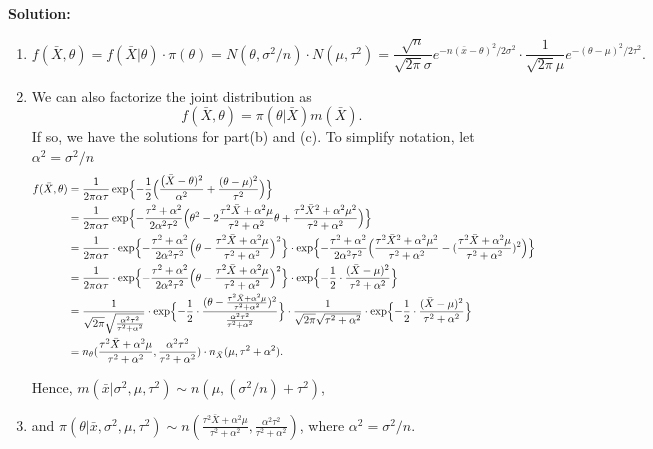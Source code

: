 \documentclass[11pt]{article}
\newcommand{\Sol}{\par {\bf Solution:}}
\begin{document}
\Sol
\begin{enumerate}[label=(\alph*)]
    \item
    \[
    f(\bar X, \theta) = f(\bar X | \theta) \cdot \pi(\theta) = N(\theta, \sigma^2/n) \cdot N(\mu, \tau^2) = \frac{\sqrt{n}}{\sqrt{2\pi}\sigma}e^{-n(\bar x - \theta)^2/2\sigma^2} \cdot \frac{1}{\sqrt{2\pi}\mu}e^{-(\theta - \mu)^2/2\tau^2}.
    \]
    
    \item
    We can also factorize the joint distribution as
    \[
    f(\bar X, \theta) = \pi(\theta|\bar X) m(\bar X).
    \]
    If so, we have the solutions for part(b) and (c).
    To simplify notation, let $\alpha^2 = \sigma^2/n$
    \begin{align*}
        f(\bar X, \theta) &= \frac{1}{2\pi \alpha \tau}\exp \Bigl\{-\frac{1}{2} \Bigl( \frac{\bigl(\bar X - \theta)^2}{\alpha^2} + \frac{(\theta - \mu)^2}{\tau^2} \Bigr) \Bigr\} \\
        &= \frac{1}{2\pi \alpha \tau} \exp \Bigl\{-\frac{\tau^2 + \alpha^2}{2\alpha^2\tau^2} \Bigl( \theta^2 - 2\frac{\tau^2\bar X + \alpha^2\mu}{\tau^2 + \alpha^2}\theta + \frac{\tau^2\bar X^2 + \alpha^2\mu^2}{\tau^2 + \alpha^2} \Bigr) \Bigr\} \\
        &= \frac{1}{2\pi \alpha \tau} \cdot 
        \exp \Bigl\{-\frac{\tau^2 + \alpha^2}{2\alpha^2\tau^2} \Bigl( \theta - \frac{\tau^2\bar X + \alpha^2\mu}{\tau^2 + \alpha^2} \Bigr)^2 \Bigr\} \cdot 
        \exp \Bigl\{-\frac{\tau^2 + \alpha^2}{2\alpha^2\tau^2} \Bigl( \frac{\tau^2\bar X^2 + \alpha^2\mu^2}{\tau^2 + \alpha^2} -  (\frac{\tau^2\bar X + \alpha^2\mu}{\tau^2 + \alpha^2})^2 \Bigr) \Bigr\} \\
        &= \frac{1}{2\pi \alpha \tau} \cdot 
        \exp \Bigl\{-\frac{\tau^2 + \alpha^2}{2\alpha^2\tau^2} \Bigl( \theta - \frac{\tau^2\bar X + \alpha^2\mu}{\tau^2 + \alpha^2} \Bigr)^2 \Bigr\} \cdot 
        \exp \Bigl\{ -\frac{1}{2}\cdot \frac{(\bar X - \mu)^2}{\tau^2 + \alpha^2} \Bigr\} \\
        &= \frac{1}{\sqrt{2\pi} \sqrt{\frac{\alpha^2 \tau^2}{\tau^2 + \alpha^2}}} \cdot 
        \exp \Bigl\{-\frac{1}{2} \cdot \frac{( \theta - \frac{\tau^2\bar X + \alpha^2\mu}{\tau^2 + \alpha^2})^2}{\frac{\alpha^2\tau^2}{\tau^2 + \alpha^2}} \Bigr\} \cdot
        \frac{1}{\sqrt{2\pi} \sqrt{\tau^2 + \alpha^2}} \cdot
        \exp \Bigl\{ -\frac{1}{2}\cdot \frac{(\bar X - \mu)^2}{\tau^2 + \alpha^2} \Bigr\} \\
        &= n_{\theta}(\frac{\tau^2\bar X + \alpha^2\mu}{\tau^2 + \alpha^2}, \frac{\alpha^2 \tau^2}{\tau^2 + \alpha^2}) \cdot n_{\bar X}(\mu, \tau^2 + \alpha^2).
    \end{align*}
    
    Hence, $m(\bar x| \sigma^2, \mu, \tau^2) \sim n(\mu, (\sigma^2/n) + \tau^2)$,
    \item
    and $\pi(\theta|\bar x, \sigma^2, \mu, \tau^2) \sim n(\frac{\tau^2\bar X + \alpha^2\mu}{\tau^2 + \alpha^2}, \frac{\alpha^2 \tau^2}{\tau^2 + \alpha^2})$, where $\alpha^2 = \sigma^2/n$.
\end{enumerate}
\end{document}
